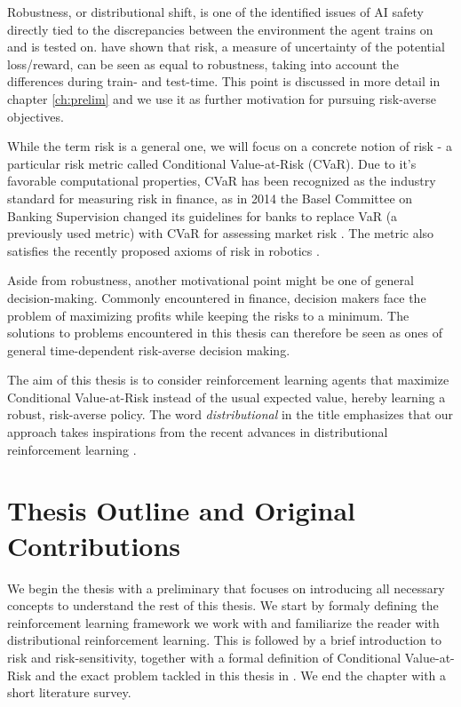 Robustness, or distributional shift, is one of the identified issues of AI safety \citep{leike2017ai, amodei2016concrete, leike2017ai} directly tied to the discrepancies between the environment the agent trains on and is tested on. \citet{chow2015risk} have shown that risk, a measure of uncertainty of the potential loss/reward, can be seen as equal to robustness, taking into account the differences during train- and test-time. This point is discussed in more detail in chapter \ref{ch:prelim} and we use it as further motivation for pursuing risk-averse objectives.

While the term risk is a general one, we will focus on a concrete notion of risk - a particular risk metric called Conditional Value-at-Risk (CVaR). 
Due to it's favorable computational properties, CVaR has been recognized as the industry standard for measuring risk in finance, as in 2014 the Basel Committee on Banking Supervision changed its guidelines for banks to replace VaR (a previously used metric) with CVaR for assessing market risk \citep{basel2013fundamental}. The metric also satisfies the recently proposed axioms of risk in robotics \citep{majumdar2017should}.

Aside from robustness, another motivational point might be one of general decision-making. Commonly encountered in finance, decision makers face the problem of maximizing profits while keeping the risks to a minimum. The solutions to problems encountered in this thesis can therefore be seen as ones of general time-dependent risk-averse decision making.

The aim of this thesis is to consider reinforcement learning agents that maximize Conditional Value-at-Risk instead of the usual expected value, hereby learning a robust, risk-averse policy. The word \textit{distributional} in the title emphasizes that our approach takes inspirations from the recent advances in distributional reinforcement learning \citep{bellemare2017distributional, dabney2017distributional}.



\section{Thesis Outline and Original Contributions}

We begin the thesis with a preliminary  that focuses on introducing all necessary concepts to understand the rest of this thesis. We start by formaly defining the reinforcement learning framework we work with and familiarize the reader with distributional reinforcement learning. This is followed by a brief introduction to risk and risk-sensitivity, together with a formal definition of Conditional Value-at-Risk and the exact problem tackled in this thesis in . We end the chapter with a short literature survey.

